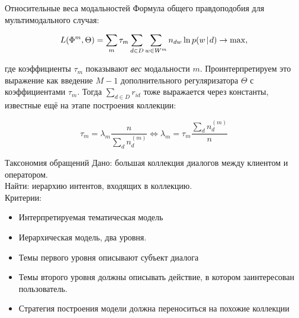 \begin{frame}{Относительные веса модальностей}
Формула общего правдоподобия для мультимодального случая:

\[
L(\Phi^m, \Theta) = \sum_m \tau_m \sum_{d\in D} \sum_{w \in W^m} n_{dw} \ln p(w \mspace{2mu}{|}\mspace{2mu} d) \rightarrow \max, 
\]

где коэффициенты $\tau_m$ показывают \textit{вес} модальности $m$. Проинтерпретируем это выражение как введение $M-1$ дополнительного регуляризатора $\Theta$ с коэффициентами $\tau_m$. Тогда $\sum_{d\in D} r_{id}$ тоже выражается через константы, известные ещё на этапе построения коллекции:

\[
\tau_m = \lambda_m \frac{n}{\sum_d n_d^{(m)}} \iff
\lambda_m = \tau_m \frac{\sum_d n_d^{(m)}}{n}
\]

\end{frame}

\begin{frame}{Таксономия обращений}
	Дано: большая коллекция диалогов между клиентом и оператором.\\
	
	Найти: иерархию интентов, входящих в коллекцию. \\
	
	Критерии: \begin{itemize}
	    \item Интерпретируемая тематическая модель
	    \item Иерархическая модель, два уровня.
	    \item  Темы первого уровня описывают субъект диалога
	    \item  Темы второго уровня должны описывать действие, в котором заинтересован пользователь.
	    \item  Стратегия построения модели должна переноситься на похожие коллекции
	\end{itemize}

\end{frame}


